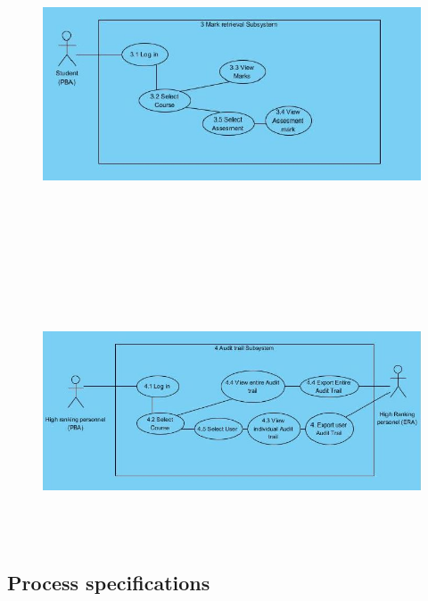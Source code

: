 \documentclass[12pt]{article}
\begin{document}
			\begin{figure}[http]
				\centering
				\includegraphics[width=6in, height=4in]{./UML/MarkRetrieval.jpg}
			\end{figure}
			
			\begin{figure}[http]
				\centering
				\includegraphics[width=6in, height=3in]{./UML/AuditAPI.jpg}
			\end{figure}
			
		\newpage
		\vspace{0.2in}
						
		\subsection{Process specifications}
		
			\vspace{0.2in}
			
\end{document}
